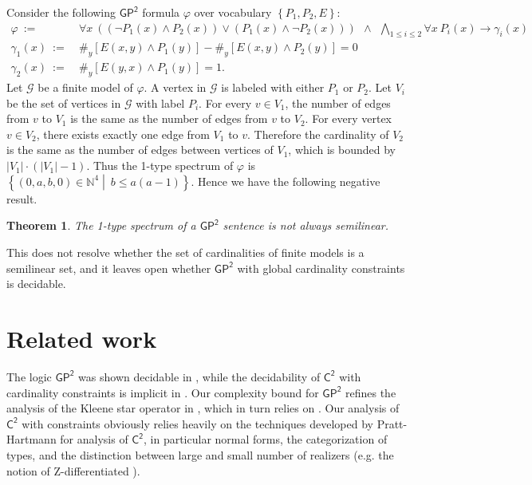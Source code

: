 \documentclass[10pt,a4paper]{article}
\newtheorem{theorem}{Theorem}
\theoremstyle{definition}
\theoremstyle{remark}
\newcommand{\cG}{\mathcal{G}}
\newcommand{\bbN}{\mathbb{N}}
\newcommand{\Ctwo}    {\mathsf{C^2}}
\newcommand{\GPtwo}   {\mathsf{GP^2}}
\newcommand{\presby}[1]  {{\#_y\left[ #1 \right]}}
\newcommand{\set}[1]         {\left\{ #1 \right\}}
\newcommand{\setc}[2]        {\left\{ #1 \middle|\  #2 \right\}}
\newcommand{\abs}[1]         {{\left| #1 \right|}}
\begin{document}
Consider the following $\GPtwo$ formula $\varphi$ over vocabulary $\set{P_1, P_2, E}$:
\begin{equation*}
    \begin{aligned}
        \varphi\ :=\ &
        \forall x\ 
        \left(
            \left(\neg P_1(x) \land P_2(x)\right) \lor
            \left(P_1(x) \land \neg P_2(x)\right)
        \right)
        \ \ \land \ \ 
        \bigwedge_{1 \le i \le 2} \forall x\ P_i(x) \to \gamma_i(x) \\
        \gamma_1(x)\ :=\ &
        \presby{E(x, y) \land P_1(y)} - \presby{E(x, y) \land P_2(y)} = 0 \\
        \gamma_2(x)\ :=\ &
        \presby{E(y, x) \land P_1(y)} = 1.
    \end{aligned}
\end{equation*}
Let $\cG$ be a finite model of $\varphi$.
A vertex in $\cG$ is labeled with either $P_1$ or $P_2$.
Let $V_i$ be the set of vertices in $\cG$ with label $P_i$.
For every $v \in V_1$, the number of edges from $v$ to $V_1$
is the same as the number of edges from $v$ to $V_2$.
For every vertex $v \in V_2$, there exists exactly one edge from $V_1$ to $v$.
Therefore the cardinality of $V_2$ is the same as the number of edges between vertices of $V_1$,
which is bounded by $\abs{V_1}\cdot(\abs{V_1}-1)$.
Thus the 1-type spectrum of $\varphi$ is $\setc{(0, a, b, 0) \in \bbN^4}{b \le a(a-1)}$.
Hence we have the following negative result.
\begin{theorem}
    The 1-type spectrum of a $\GPtwo$ sentence is not always semilinear.
\end{theorem}

This does not resolve whether the set of cardinalities of finite models is a semilinear set, and
it leaves open whether $\GPtwo$ with global cardinality constraints is decidable.


\section{Related work} \label{sec:related}

The logic $\GPtwo$ was shown decidable in \cite{percentage,twovarpres}, while the decidability
of $\Ctwo$ with cardinality constraints is implicit in \cite{tonyeryk, ultimatelyperiodic}. Our complexity bound for $\GPtwo$ refines the analysis of the Kleene star operator in \cite{usicalp}, which in turn relies on \cite{kleenestar}. Our analysis of $\Ctwo$ with constraints obviously relies heavily on the techniques developed by Pratt-Hartmann for analysis of $\Ctwo$, in particular normal forms, the categorization of types, and the distinction between large and small number of realizers (e.g. the notion of Z-differentiated \cite{ctwocomplexity,gctwocomplexity}).
\end{document}
